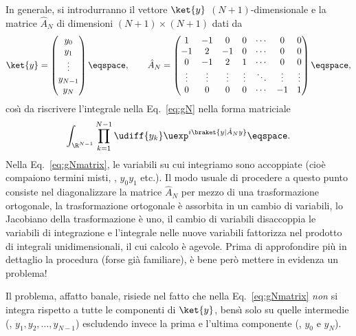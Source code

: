 In generale, si introdurranno il vettore $\ket{y}$ $(N+1)$-dimensionale e la
matrice $\hat{A}_{N}$ di dimensioni $(N+1)\times (N+1)$ dati da
\begin{equation}\label{eq:|y>AN}
\ket{y} = \begin{pmatrix} y_{0} \\ y_{1} \\ \vdots \\ y_{N-1} \\ y_{N}
\end{pmatrix} \eqspace ,  \qquad 
\hat{A}_{N} = \begin{pmatrix} 
1      & -1     & 0      & 0      & \cdots & 0      & 0 \\
-1     & 2      & -1     & 0      & \cdots & 0      & 0 \\
0      & -1     & 2      & 1      & \cdots & 0      & 0  \\
\vdots & \vdots & \vdots & \vdots & \ddots & \vdots & \vdots \\
0      & 0      & 0      & 0      & \cdots & -1     & 1
\end{pmatrix}
\eqspace, 
\end{equation}
cos\`{\i} da  riscrivere l'integrale nella Eq.~\eqref{eq:gN} nella forma matriciale
\begin{equation}\label{eq:gNmatrix}
\int_{\R^{N-1}} \prod_{k=1}^{N-1} \udiff{y_{k}} \uexp^{ i \braket{ y |
\hat{A}_{N}
y}} \eqspace .
\end{equation}
Nella Eq.~\eqref{eq:gNmatrix}, le variabili su cui integriamo sono accoppiate
(cio\`e compaiono termini misti, \eg, $y_{0} y_{1}$ etc.).  Il modo usuale di
procedere a questo punto consiste nel diagonalizzare la matrice $\hat{A}_{N}$
per mezzo di una trasformazione ortogonale, la trasformazione ortogonale \`e
assorbita in un cambio di variabili, lo Jacobiano della trasformazione
\`e uno, il cambio di variabili disaccoppia le variabili di
integrazione e l'integrale nelle nuove variabili fattorizza nel prodotto di
integrali unidimensionali, il cui calcolo \`e agevole.  Prima di approfondire
pi\`u in
dettaglio la procedura (forse gi\`a familiare), \`e bene  per\`o  mettere in
evidenza un problema!

Il problema, affatto banale, risiede nel fatto che nella Eq.~\eqref{eq:gNmatrix}
\emph{non} si integra rispetto a  tutte le componenti di $\ket{y}$,
bens\`{\i} solo su quelle intermedie (\ie, $y_{1}, y_{2} , \ldots, y_{N-1}$)
escludendo invece la prima e l'ultima componente (\ie, $y_{0}$ e $y_{N}$).


